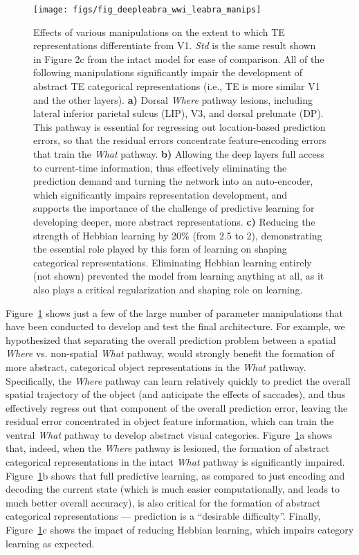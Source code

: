 \documentclass[12pt,twoside]{naturefigs}  %
\newif\myifpdf
\begin{document}
\begin{figure}
  \centering\texttt{[image: figs/fig\_deepleabra\_wwi\_leabra\_manips]}
  \caption{\small \protect{} Effects of various manipulations on the extent to which TE representations differentiate from V1.  {\em Std} is the same result shown in Figure 2c from the intact model for ease of comparison.  All of the following  manipulations significantly impair the development of abstract TE categorical representations (i.e., TE is more similar V1 and the other layers).  {\bf a)} Dorsal {\em Where} pathway lesions, including lateral inferior parietal sulcus (LIP), V3, and dorsal prelunate (DP).  This pathway is essential for regressing out location-based prediction errors, so that the residual errors concentrate feature-encoding errors that train the {\em What} pathway.  {\bf b)} Allowing the deep layers full access to current-time information, thus effectively eliminating the prediction demand and turning the network into an auto-encoder, which significantly impairs representation development, and supports the importance of the challenge of predictive learning for developing deeper, more abstract representations.  {\bf c)} Reducing the strength of Hebbian learning by 20\% (from 2.5 to 2), demonstrating the essential role played by this form of learning on shaping categorical representations.  Eliminating Hebbian learning entirely (not shown) prevented the model from learning anything at all, as it also plays a critical regularization and shaping role on learning.}
  \label{fig.manips}
\end{figure}

Figure~\ref{fig.manips} shows just a few of the large number of parameter manipulations that have been conducted to develop and test the final architecture.  For example, we hypothesized that separating the overall prediction problem between a spatial {\em Where} vs. non-spatial {\em What} pathway\cite{UngerleiderMishkin82,GoodaleMilner92}, would strongly benefit the formation of more abstract, categorical object representations in the {\em What} pathway.  Specifically, the {\em Where} pathway can learn relatively quickly to predict the overall spatial trajectory of the object (and anticipate the effects of saccades), and thus effectively regress out that component of the overall prediction error, leaving the residual error concentrated in object feature information, which can train the ventral {\em What} pathway to develop abstract visual categories.  Figure~\ref{fig.manips}a shows that, indeed, when the {\em Where} pathway is lesioned, the formation of abstract categorical representations in the intact {\em What} pathway is significantly impaired.  Figure~\ref{fig.manips}b shows that full predictive learning, as compared to just encoding and decoding the current state (which is much easier computationally, and leads to much better overall accuracy), is also critical for the formation of abstract categorical representations --- prediction is a ``desirable difficulty''\cite{Bjork94}.  Finally, Figure~\ref{fig.manips}c shows the impact of reducing Hebbian learning, which impairs category learning as expected.
\end{document}
